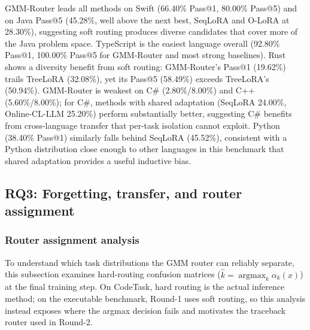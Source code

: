 GMM-Router leads all methods on Swift (66.40\% Pass@1, 80.00\% Pass@5) and on Java Pass@5 (45.28\%, well above the next best, SeqLoRA and O-LoRA at 28.30\%), suggesting soft routing produces diverse candidates that cover more of the Java problem space. TypeScript is the easiest language overall (92.80\% Pass@1, 100.00\% Pass@5 for GMM-Router and most strong baselines). Rust shows a diversity benefit from soft routing: GMM-Router's Pass@1 (19.62\%) trails TreeLoRA (32.08\%), yet its Pass@5 (58.49\%) exceeds TreeLoRA's (50.94\%). GMM-Router is weakest on C\# (2.80\%/8.00\%) and C++ (5.60\%/8.00\%); for C\#, methods with shared adaptation (SeqLoRA 24.00\%, Online-CL-LLM 25.20\%) perform substantially better, suggesting C\# benefits from cross-language transfer that per-task isolation cannot exploit. Python (38.40\% Pass@1) similarly falls behind SeqLoRA (45.52\%), consistent with a Python distribution close enough to other languages in this benchmark that shared adaptation provides a useful inductive bias.

\subsection{RQ3: Forgetting, transfer, and router assignment}
\label{sec:rq3}

\subsubsection{Router assignment analysis}
\label{sec:routing_analysis}

To understand which task distributions the GMM router can reliably separate, this subsection examines hard-routing confusion matrices ($\hat k=\operatorname{argmax}_k\alpha_k(x)$) at the final training step. On CodeTask, hard routing is the actual inference method; on the executable benchmark, Round-1 uses soft routing, so this analysis instead exposes where the argmax decision fails and motivates the traceback router used in Round-2.

